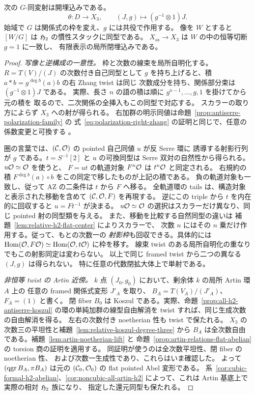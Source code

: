 \begin{theorem}[次数移動を記録する開埋込み]
\label{thm:polarization-inertia-open}
次の $G$-同変射は開埋込みである。
\[
 \theta:D\longrightarrow X_3,\qquad
 (J,g)\longmapsto (g^{-1}\otimes 1)J .
\]
始域で $G$ は関係式の枠を変え、$g$ には共役で作用する。
像を $W$ とすると $[W/G]$ は $\mathfrak H_2$ の慣性スタックに同型である。
$X_{\mathrm{as}}\to X_3$ は $W$ の中の恒等切断 $g=1$ に一致し、
有限表示の局所閉埋込みである。
\end{theorem}
\begin{proof}
\emph{写像と逆構成の一意性。}
枠と次数の線束を局所自明化する。$R=T(V)/(J)$ の次数付き自己同型として
$g$ を持ち上げると、積 $a*b=g^{\deg b}(a)b$ の右 Zhang twist は同じ
次数成分を持ち、関係部分束は $(g^{-1}\otimes1)J$ である。
実際、長さ $n$ の語の積は順に $g^{n-1},\ldots,g,1$ を掛けてから元の積を
取るので、二次関係の全挿入もこの同型で対応する。
スカラーの取り方によらず $X_3$ への射が得られる。
右加群の明示同値は命題~\ref{prop:antiserre-polarization-family} の
式~\eqref{eq:polarization-right-zhang} の証明と同じで、任意の係数変更と可換する
\cite[Theorem 3.1]{Zhang1996}。

圏の言葉では、$(\mathcal C,\mathcal O)$ の pointed 自己同値 $u$ が反 Serre 環に
誘導する射影行列が $g$ である。$t=S^{-1}[2]$ と $u$ の可換同型は
Serre 双対の自然性から得られる。$u\mathcal O\simeq\mathcal O$ を使うと、
$F=ut$ の軌道対象 $F^n\mathcal O$ は $t^n\mathcal O$ と同定される。
右規約の積 $F^{\deg b}(a)\circ b$ をこの同定で移したものが上記の積である。
負の軌道対象も一致し、従って AZ の二条件は $t$ から $F$ へ移る。
全軌道環の tails は、構造対象と表示された移動を含めて
$(\mathcal C,\mathcal O,F)$ を再現する。
逆にこの triple から $t$ を内在的に回収すると $u=Ft^{-1}$ が決まる。
$u\mathcal O\simeq\mathcal O$ の選択はスカラーだけ異なり、同じ pointed 射の同型類を与える。
また、移動を比較する自然同型の違いは
補題~\ref{lem:relative-h2-flat-center} によりスカラーで、
次数 $n$ にはその $n$ 乗だけ作用する。従って、もとの次数一の
\emph{射影枠}も回収できる。具体的には
$\operatorname{Hom}(\mathcal O,F\mathcal O)\simeq\operatorname{Hom}(\mathcal O,t\mathcal O)$ に枠を移す。
線束 twist のある局所自明化の重なりでもこの射影同定は変わらない。
以上で同じ framed twist から二つの異なる $(J,g)$ は得られない。
特に任意の代数閉拡大体上で単射である。

\emph{非恒等 twist の Artin 近傍。}
$k$ 点 $(J_0,g_0)$ において、剰余体 $k$ の局所 Artin 環 $A$ 上の
任意の framed 関係式変形 $J'_A$ を取り、
$B_A=T(V_A)/(J'_A)$、$F_A=(1)$ と書く。
閉 fiber $B_0$ は Koszul である。実際、命題~\ref{prop:all-h2-antiserre-koszul}
の環の単純加群の線型自由解消を twist すれば、同じ生成次数の自由解消を得る。
左右の次数付き noetherian 性も twist で保たれる。
$X_3$ の次数三の平坦性と補題~\ref{lem:relative-koszul-degree-three} から
$B_A$ は全次数自由である。補題~\ref{lem:artin-noetherian-lift} と
命題~\ref{prop:artin-relations-flat-abelian} の torsion 商の証明を適用する。
同証明が使うのは全次数平坦性、閉 fiber の noetherian 性、
および次数一生成性であり、これらはいま確認した。
よって $(\operatorname{qgr} B_A,\pi B_A)$ は元の $(\mathcal C_0,\mathcal O_0)$ の flat pointed Abel 変形である。
系~\ref{cor:cubic-formal-h2-abelian}、\ref{cor:noncubic-all-artin-h2}
によって、これは Artin 基底上で実際の相対 $\mathfrak H_2$ 族になり、
指定した還元同型も保たれる。


\end{proof}
